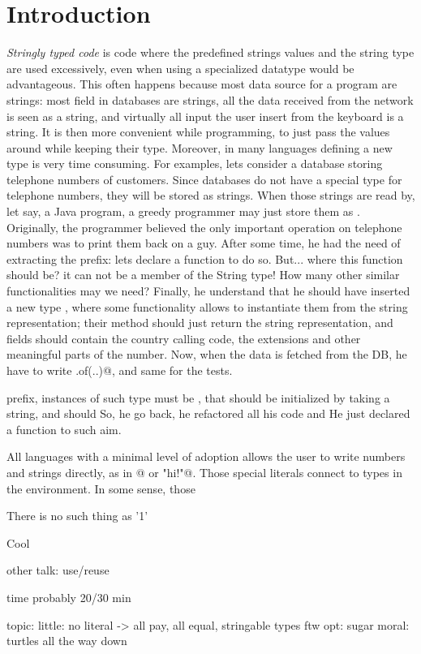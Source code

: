 \section{Introduction}
\emph{Stringly typed code} is
code where the predefined strings values and the string type are used excessively,
even when using a specialized datatype would be advantageous.
This often happens because most data source for a program are strings:
most field in databases are strings, all the data received from the network is seen as a 
string, and virtually all input the user insert from the keyboard is a string.
It is then more convenient while programming, to just pass the values around while keeping their type.
Moreover, in many languages defining a new type is very time consuming.
For examples, lets consider a database storing telephone numbers of customers.
Since databases do not have a special type for telephone numbers, they will be stored as strings.
When those strings are read by, let say, a Java program, a greedy programmer may just store
them as \Q@String@.
Originally, the programmer believed the only important operation on telephone numbers
was to print them back on a guy.
After some time, he had the need of extracting the prefix: lets declare a function to do so.
But... where this function should be? it can not be a member of the String type!
How many other similar functionalities may we need?
Finally, he understand that he should have inserted a new type 
\Q@TelephoneNumber@, where some functionality allows
to instantiate them from the string representation; their
\Q@toString@ method should just return the
string representation, and fields should contain
the country calling code, the extensions and other meaningful parts of the number.
Now, when the data is fetched from the DB, he have to write
\Q@TelephoneNumber.of(..)@, and same for the tests.

prefix, instances of such type must be , that should be initialized by taking a string, and should  
So, he go back, he refactored all his code and 
He just declared a function to such aim.

All languages with a minimal level of adoption allows
the user to write numbers and strings directly, 
as in @ or \Q@"hi!"@.
Those special literals connect to types in the environment.
In some sense, those


There is no such thing as '1'

Cool

other talk: use/reuse

time
probably 20/30 min

topic: 
little: no literal -> all pay, all equal, stringable types ftw 
opt: sugar 
moral: turtles all the way down




\begin{acks}

\end{acks}
